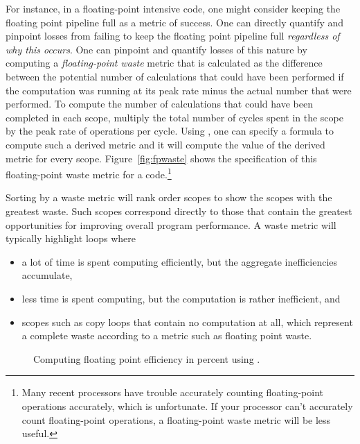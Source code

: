 \documentclass[11pt,twoside,letterpaper]{report}
\begin{document}
For instance, in a floating-point intensive code, one might consider keeping the floating point pipeline full as a metric of success.
One can directly quantify and pinpoint losses from failing to keep the floating point pipeline full {\em regardless of why this occurs}.
One can pinpoint and quantify losses of this nature by computing a {\em floating-point waste} metric that is calculated as the difference between the potential number of calculations that could have been performed if the computation was running at its peak rate minus the actual number that were performed.
To compute the number of calculations that could have been completed in each scope, multiply the total number of cycles spent in the scope by the peak rate of operations per cycle.
Using \hpcviewer{}, one can specify a formula to compute such a derived metric and it will compute the value of the derived metric for every scope.
Figure~\ref{fig:fpwaste} shows the specification of this floating-point waste metric for a code.\footnote{Many recent processors have trouble accurately counting floating-point operations accurately, which is unfortunate. If your processor can't accurately count floating-point operations, a floating-point waste metric will be less useful.}

Sorting by a waste metric will rank order scopes to show the scopes with the greatest waste.
Such scopes correspond directly to those that contain the greatest opportunities for improving overall program performance.
A waste metric will typically highlight loops where
\begin{itemize}
\item a lot of time is spent computing efficiently, but the aggregate inefficiencies accumulate,
\item less time is spent computing, but the computation is rather inefficient, and
\item scopes such as copy loops that contain no computation at all, which represent a complete waste according to a metric such as floating point waste.
\end{itemize}

\begin{figure}[t]
\caption{Computing floating point efficiency in percent using \hpcviewer{}.}
\label{fig:fpefficiency}
\end{figure}
\end{document}
